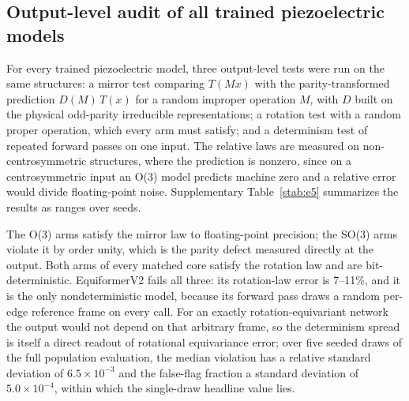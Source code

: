 \subsection*{Output-level audit of all trained piezoelectric models}

For every trained piezoelectric model, three output-level tests were run on the same structures: a mirror test comparing $T(Mx)$ with the parity-transformed prediction $D(M)\,T(x)$ for a random improper operation $M$, with $D$ built on the physical odd-parity irreducible representations; a rotation test with a random proper operation, which every arm must satisfy; and a determinism test of repeated forward passes on one input. The relative laws are measured on non-centrosymmetric structures, where the prediction is nonzero, since on a centrosymmetric input an O(3) model predicts machine zero and a relative error would divide floating-point noise. Supplementary Table~\ref{stab:e5} summarizes the results as ranges over seeds.

The O(3) arms satisfy the mirror law to floating-point precision; the SO(3) arms violate it by order unity, which is the parity defect measured directly at the output. Both arms of every matched core satisfy the rotation law and are bit-deterministic. EquiformerV2 fails all three: its rotation-law error is 7--11\%, and it is the only nondeterministic model, because its forward pass draws a random per-edge reference frame on every call. For an exactly rotation-equivariant network the output would not depend on that arbitrary frame, so the determinism spread is itself a direct readout of rotational equivariance error; over five seeded draws of the full population evaluation, the median violation has a relative standard deviation of $6.5\times10^{-3}$ and the false-flag fraction a standard deviation of $5.0\times10^{-4}$, within which the single-draw headline value lies.

